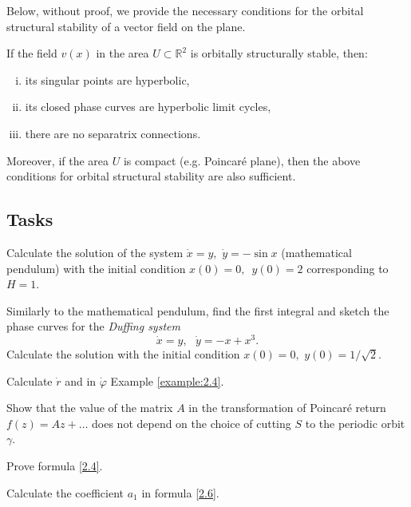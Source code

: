Below, without proof, we provide the necessary conditions for the orbital structural stability of a vector field on the plane.

\begin{theorem}\label{theo:2.43}
	If the field $v (x)$ in the area $U\subset \mathbb{R}^{2}$ is orbitally structurally stable, then:
	\begin{enumerate}[(i)]
		\item its singular points are hyperbolic,
		\item its closed phase curves are hyperbolic limit cycles,
		\item there are no separatrix connections.
	\end{enumerate}
	Moreover, if the area $U$ is compact (e.g. Poincaré plane), then the above conditions for orbital structural stability are also sufficient.
\end{theorem}

\subsection*{Tasks}
\begin{task}
	Calculate the solution of the system $\dot{x}=y,$ $%
	\dot{y}=-\sin x$ (mathematical pendulum) with the initial condition $%
	x(0)=0,$\ $y(0)=2$ corresponding to $H = 1$.
\end{task}

\begin{task}
	Similarly to the mathematical pendulum, find the first integral and sketch the phase curves for the \textit{Duffing system}
	$$
	\dot{x}=y,\text{ \ }\dot{y}=-x+x^{3}.
	$$
	Calculate the solution with the initial condition $x(0)=0,$ $y(0)=1/%
	\sqrt{2}$.
\end{task}

\begin{task}
	Calculate $\dot{r}$ and in $\dot{\varphi}$ Example \ref{example:2.4}.
\end{task}

\begin{task}
	Show that the value of the matrix $A$ in the transformation of Poincaré return $f (z) = Az +\ldots$ does not depend on the choice of cutting $S$ to the periodic orbit $\gamma .$
\end{task}

\begin{task}
	Prove formula \eqref{2.4}.
\end{task}

\begin{task}
	Calculate the coefficient $a_1$ in formula \eqref{2.6}.
\end{task}

